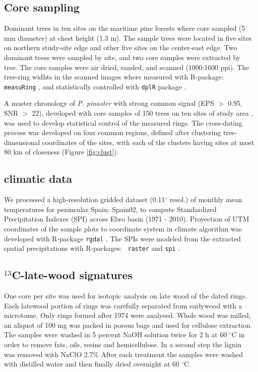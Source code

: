 \documentclass[review,authoryear]{elsarticle}
\begin{document}
\subsection{Core sampling}
Dominant trees in ten sites on the maritime pine forests where core
sampled (5 mm diameter) at chest height (1.3 m). The sample trees were
located in five sites on northern study-site edge and other five sites
on the center-east edge. Two dominant trees were sampled by site, and
two core samples were extracted by tree. The core samples were air
dried, sanded, and scanned (1000:1600 ppi). The tree-ring widhts in
the scanned images where measured with R-package: {\tt measuRing}
\citep{Lara2015}, and statistically controlled with {\tt dplR} package
\citep{Bunn2010}.

A master chronology of \textit{P. pinaster} with strong common signal
(EPS $>$ 0.95, SNR $>$ 22), developed with core samples of 150 trees
on ten sites of study area \citep{Bogino2008}, was used to develop
statistical control of the measured rings. The cross-dating process
was developed on four common regions, defined after clustering
tree-dimensional coordinates of the sites, with each of the clusters
having sites at most 80 km of closeness (Figure \ref{fig:clust}).

\subsection{climatic data}
We processed a high-resolution gridded dataset (0.11$^{\circ}$ resol.)
of monthly mean temperatures for peninsular Spain: Spain02,
\citep{Herrera2015} to compute Standardized Precipitation Indexes
(SPI) across Ebro basin (1971 - 2010). Proyection of UTM coordinates
of the sample plots to coordinate system in climate algorithm was
developed with R-package {\tt rgdal} \citep{Bivand2015}. The SPIs were
modeled from the extracted spatial precipitations with R-packages: {\tt
  raster}\citep{Hijmans2015} and {\tt spi} \citep{Neves2012}.

\subsection{$^{13}$C-late-wood signatures}
One core per site was used for isotopic analysis on late wood of the
dated rings. Each latewood portion of rings was carefully separated
from earlywood with a microtome. Only rings formed after 1974 were
analysed. Whole wood was milled, an aliquot of 100 mg was packed in
porous bags and used for cellulose extraction. The samples were washed
in 5 percent NaOH solution twice for 2 h at 60 $^{\circ}$C in order to
remove fats, oils, resins and hemicellulose. In a second step the
lignin was removed with NaClO 2.7\% After each treatment the samples
were washed with distilled water and then finally dried overnight at
60 $^{\circ}$C.
\end{document}
